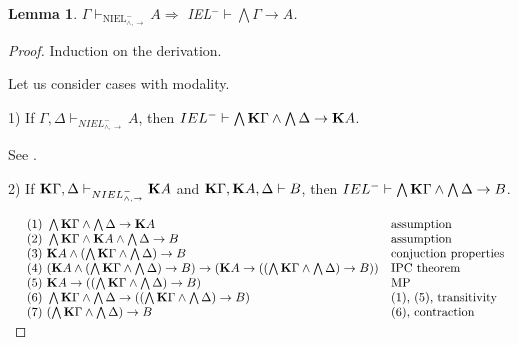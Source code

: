 \documentclass[a4paper]{article}
\newtheorem{lemma}{Lemma}
\begin{document}
  \vspace{\baselineskip}

  \begin{lemma}
    $\Gamma \vdash_{\text{NIEL}^{-}_{\land, \to}} A \Rightarrow$ IEL$^{-} \vdash \bigwedge \Gamma \rightarrow A$.
  \end{lemma}

  \begin{proof}
Induction on the derivation.

  \vspace{\baselineskip}

Let us consider cases with modality.

\vspace{\baselineskip}

1) If $\Gamma, \Delta \vdash_{NIEL^{-}_{\land, \to}} A$, then $IEL^{-} \vdash \bigwedge {\bf K} \Gamma \wedge \bigwedge \Delta \rightarrow {\bf K}A$.

See \cite{Krupski}.

\vspace{\baselineskip}

2) If ${\bf K} \Gamma, \Delta \vdash_{NIEL^{-}_{\land, \to}} {\bf K} A$ and ${\bf K}\Gamma, {\bf K} A, \Delta \vdash B$, then $IEL^{-} \vdash \bigwedge {\bf K} \Gamma \wedge \bigwedge \Delta \rightarrow B$.

$\begin{array}{lll}
&\text{(1) } \bigwedge {\bf K} \Gamma \wedge \bigwedge \Delta \to {\bf K} A& \text{assumption} \\
&\text{(2) } \bigwedge {\bf K} \Gamma \wedge {\bf K}A \wedge \bigwedge \Delta \rightarrow B& \text{assumption} \\
&\text{(3) } {\bf K} A \wedge (\bigwedge {\bf K} \Gamma \wedge \bigwedge \Delta) \rightarrow B& \text{conjuction properties} \\
&\text{(4) } ({\bf K} A \wedge (\bigwedge {\bf K} \Gamma \wedge \bigwedge \Delta) \rightarrow B) \rightarrow ({\bf K } A \rightarrow ((\bigwedge {\bf K} \Gamma \wedge \bigwedge \Delta) \rightarrow B)) & \text{IPC theorem} \\
&\text{(5) } {\bf K} A \rightarrow ((\bigwedge {\bf K} \Gamma \wedge \bigwedge \Delta) \rightarrow B) & \text{MP } \\
&\text{(6) } \bigwedge {\bf K} \Gamma \wedge \bigwedge \Delta \to ((\bigwedge {\bf K} \Gamma \wedge \bigwedge \Delta) \rightarrow B) & \text{(1), (5), transitivity} \\
&\text{(7) } (\bigwedge {\bf K} \Gamma \wedge \bigwedge \Delta) \rightarrow B & \text{(6), contraction}
\end{array}$

  \end{proof}
\end{document}
